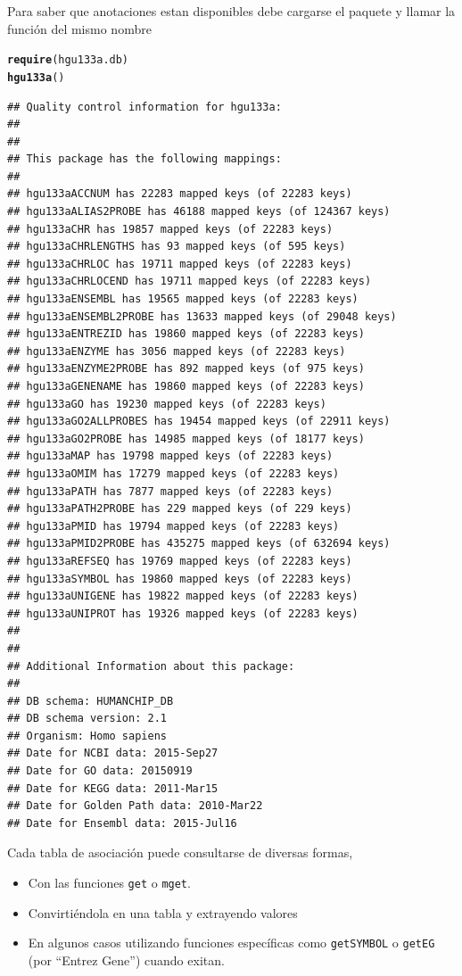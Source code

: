 \documentclass[a4paper]{article}\usepackage[]{graphicx}\usepackage[]{color}
\makeatletter
\newcommand{\hlstd}[1]{\textcolor[rgb]{0.345,0.345,0.345}{#1}}%
\newcommand{\hlkwd}[1]{\textcolor[rgb]{0.737,0.353,0.396}{\textbf{#1}}}%
\newenvironment{kframe}{%
 \def\at@end@of@kframe{}%
 \ifinner\ifhmode%
  \def\at@end@of@kframe{\end{minipage}}%
  \begin{minipage}{\columnwidth}%
 \fi\fi%
 \def\FrameCommand##1{\hskip\@totalleftmargin \hskip-\fboxsep
 \colorbox{shadecolor}{##1}\hskip-\fboxsep
     \hskip-\linewidth \hskip-\@totalleftmargin \hskip\columnwidth}%
 \MakeFramed {\advance\hsize-\width
   \@totalleftmargin\z@ \linewidth\hsize
   \@setminipage}}%
 {\par\unskip\endMakeFramed%
 \at@end@of@kframe}
\newenvironment{knitrout}{}{} %
\makeatother
\begin{document}
Para saber que anotaciones estan disponibles debe cargarse el paquete y llamar la función del mismo nombre 

\begin{knitrout}
\color{fgcolor}\begin{kframe}
\begin{alltt}
\hlkwd{require}\hlstd{(hgu133a.db)}
\hlkwd{hgu133a}\hlstd{()}
\end{alltt}
\begin{verbatim}
## Quality control information for hgu133a:
## 
## 
## This package has the following mappings:
## 
## hgu133aACCNUM has 22283 mapped keys (of 22283 keys)
## hgu133aALIAS2PROBE has 46188 mapped keys (of 124367 keys)
## hgu133aCHR has 19857 mapped keys (of 22283 keys)
## hgu133aCHRLENGTHS has 93 mapped keys (of 595 keys)
## hgu133aCHRLOC has 19711 mapped keys (of 22283 keys)
## hgu133aCHRLOCEND has 19711 mapped keys (of 22283 keys)
## hgu133aENSEMBL has 19565 mapped keys (of 22283 keys)
## hgu133aENSEMBL2PROBE has 13633 mapped keys (of 29048 keys)
## hgu133aENTREZID has 19860 mapped keys (of 22283 keys)
## hgu133aENZYME has 3056 mapped keys (of 22283 keys)
## hgu133aENZYME2PROBE has 892 mapped keys (of 975 keys)
## hgu133aGENENAME has 19860 mapped keys (of 22283 keys)
## hgu133aGO has 19230 mapped keys (of 22283 keys)
## hgu133aGO2ALLPROBES has 19454 mapped keys (of 22911 keys)
## hgu133aGO2PROBE has 14985 mapped keys (of 18177 keys)
## hgu133aMAP has 19798 mapped keys (of 22283 keys)
## hgu133aOMIM has 17279 mapped keys (of 22283 keys)
## hgu133aPATH has 7877 mapped keys (of 22283 keys)
## hgu133aPATH2PROBE has 229 mapped keys (of 229 keys)
## hgu133aPMID has 19794 mapped keys (of 22283 keys)
## hgu133aPMID2PROBE has 435275 mapped keys (of 632694 keys)
## hgu133aREFSEQ has 19769 mapped keys (of 22283 keys)
## hgu133aSYMBOL has 19860 mapped keys (of 22283 keys)
## hgu133aUNIGENE has 19822 mapped keys (of 22283 keys)
## hgu133aUNIPROT has 19326 mapped keys (of 22283 keys)
## 
## 
## Additional Information about this package:
## 
## DB schema: HUMANCHIP_DB
## DB schema version: 2.1
## Organism: Homo sapiens
## Date for NCBI data: 2015-Sep27
## Date for GO data: 20150919
## Date for KEGG data: 2011-Mar15
## Date for Golden Path data: 2010-Mar22
## Date for Ensembl data: 2015-Jul16
\end{verbatim}
\end{kframe}
\end{knitrout}

Cada tabla de asociación puede consultarse de diversas formas, 
\begin{itemize}
\item Con las funciones \texttt{get} o \texttt{mget}.
\item Convirtiéndola en una tabla y extrayendo valores
\item En algunos casos utilizando funciones específicas como \texttt{getSYMBOL} o \texttt{getEG} (por ``Entrez Gene'') cuando exitan.
\end{itemize}
\end{document}
